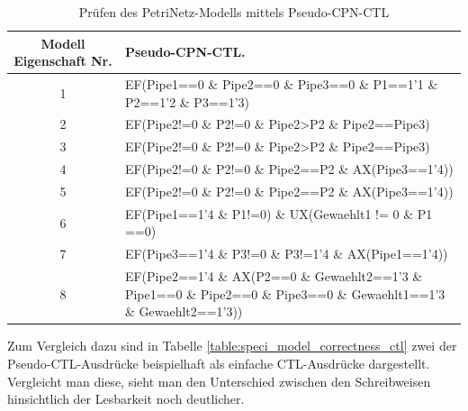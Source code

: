 \begin{table}[H]
	\begin{tabular}{|c|p{10cm}|}
		\hline Modell Eigenschaft Nr. & Pseudo-CPN-CTL.\\ 
		\hline 1 & EF(Pipe1==0 \& Pipe2==0 \& Pipe3==0 \& \newline
		P1==1’1 \& P2==1’2 \& P3==1’3) \\ 
		\hline 2 & EF(Pipe2!=0 \& P2!=0 \& Pipe2>P2 \& \newline
		Pipe2==Pipe3)\\
		\hline 3 & EF(Pipe2!=0 \& P2!=0 \& Pipe2>P2 \& \newline
		Pipe2==Pipe3)\\
		\hline 4 & EF(Pipe2!=0 \& P2!=0 \& Pipe2==P2 \& \newline
		AX(Pipe3==1’4))\\
		\hline 5 & EF(Pipe2!=0 \& P2!=0 \& Pipe2==P2 \& \newline
		AX(Pipe3==1’4))\\
		\hline 6 & EF(Pipe1==1'4 \& P1!=0) \& UX(Gewaehlt1 != 0 \& P1 ==0)\\
		\hline 7 & EF(Pipe3==1’4 \& P3!=0 \& P3!=1’4 \& \newline
		AX(Pipe1==1’4))\\
		\hline 8 & EF(Pipe2==1’4 \& \newline
		AX(P2==0 \& Gewaehlt2==1’3 \& \newline
		Pipe1==0 \& Pipe2==0 \& Pipe3==0 \& \newline
		Gewaehlt1==1’3 \& Gewaehlt2==1’3))\\
		\hline
	\end{tabular}
	\caption{Prüfen des PetriNetz-Modells mittels Pseudo-CPN-CTL}
	\label{table:speci_model_correctness} 
\end{table}

Zum Vergleich dazu sind in Tabelle \ref{table:speci_model_correctness_ctl} zwei der Pseudo-CTL-Ausdrücke beispielhaft als einfache CTL-Ausdrücke dargestellt. Vergleicht man diese, sieht man den Unterschied zwischen den Schreibweisen hinsichtlich der Lesbarkeit noch deutlicher.

